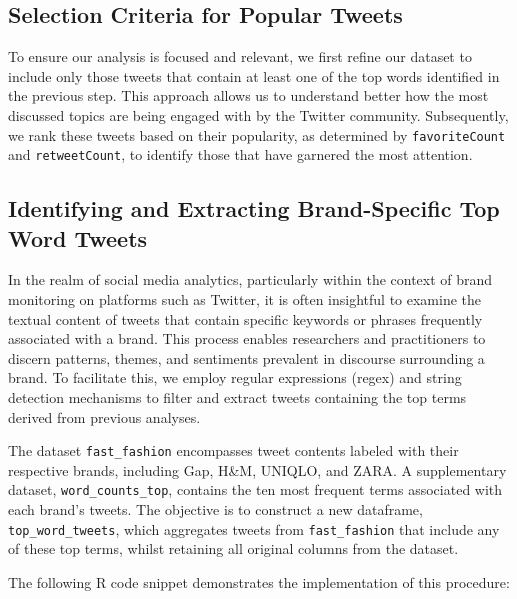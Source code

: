 \documentclass[
]{book}
\begin{document}
\hypertarget{selection-criteria-for-popular-tweets}{%
\subsection{Selection Criteria for Popular Tweets}\label{selection-criteria-for-popular-tweets}}

To ensure our analysis is focused and relevant, we first refine our dataset to include only those tweets that contain at least one of the top words identified in the previous step. This approach allows us to understand better how the most discussed topics are being engaged with by the Twitter community. Subsequently, we rank these tweets based on their popularity, as determined by \texttt{favoriteCount} and \texttt{retweetCount}, to identify those that have garnered the most attention.

\hypertarget{identifying-and-extracting-brand-specific-top-word-tweets}{%
\subsection{Identifying and Extracting Brand-Specific Top Word Tweets}\label{identifying-and-extracting-brand-specific-top-word-tweets}}

In the realm of social media analytics, particularly within the context of brand monitoring on platforms such as Twitter, it is often insightful to examine the textual content of tweets that contain specific keywords or phrases frequently associated with a brand. This process enables researchers and practitioners to discern patterns, themes, and sentiments prevalent in discourse surrounding a brand. To facilitate this, we employ regular expressions (regex) and string detection mechanisms to filter and extract tweets containing the top terms derived from previous analyses.

The dataset \texttt{fast\_fashion} encompasses tweet contents labeled with their respective brands, including Gap, H\&M, UNIQLO, and ZARA. A supplementary dataset, \texttt{word\_counts\_top}, contains the ten most frequent terms associated with each brand's tweets. The objective is to construct a new dataframe, \texttt{top\_word\_tweets}, which aggregates tweets from \texttt{fast\_fashion} that include any of these top terms, whilst retaining all original columns from the dataset.

The following R code snippet demonstrates the implementation of this procedure:
\end{document}
